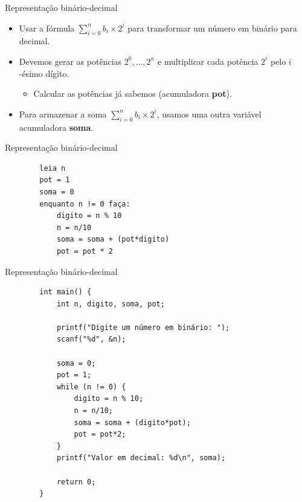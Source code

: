 \documentclass[handout]{beamer}
\begin{document}
\begin{frame}[fragile]{Representação binário-decimal}

    \begin{itemize}
        \item Usar a fórmula $\sum_{i=0}^n b_i \times 2^i $ para transformar um número em binário para decimal.
        \item Devemos gerar as potências $2^0, \ldots, 2^n$ e multiplicar cada potência $2^i$ pelo $i$-ésimo dígito.
        \begin{itemize}
            \item Calcular as potências já sabemos (acumuladora {\bf pot}).
        \end{itemize}
        \item Para armazenar a soma $\sum_{i=0}^n b_i \times 2^i$, usamos uma outra variável acumuladora {\bf soma}.
    \end{itemize}
\end{frame}

\begin{frame}[fragile]{Representação binário-decimal}

    \begin{verbatim}
        leia n
        pot = 1
        soma = 0
        enquanto n != 0 faça:
            digito = n % 10
            n = n/10
            soma = soma + (pot*digito)
            pot = pot * 2
    \end{verbatim}
\end{frame}

\begin{frame}[fragile]{Representação binário-decimal}
    
    \begin{verbatim}
        int main() {
            int n, digito, soma, pot;

            printf("Digite um número em binário: ");
            scanf("%d", &n);
            
            soma = 0;
            pot = 1;
            while (n != 0) {
                digito = n % 10;
                n = n/10;
                soma = soma + (digito*pot);
                pot = pot*2;
            }
            printf("Valor em decimal: %d\n", soma);

            return 0;
        }
    \end{verbatim}
\end{frame}
\end{document}
